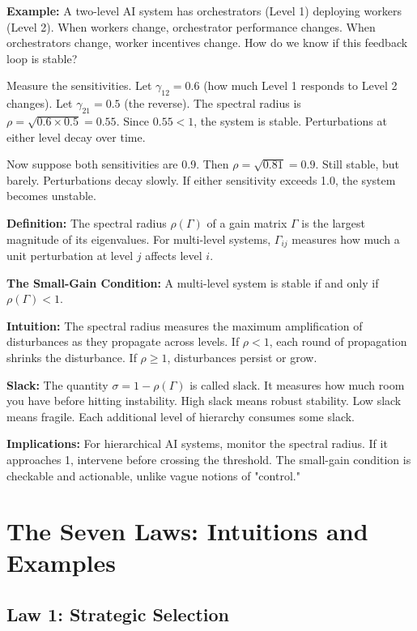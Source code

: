 \documentclass[12pt]{article}
\begin{document}
\textbf{Example:} A two-level AI system has orchestrators (Level 1) deploying workers (Level 2). When workers change, orchestrator performance changes. When orchestrators change, worker incentives change. How do we know if this feedback loop is stable?

Measure the sensitivities. Let $\gamma_{12} = 0.6$ (how much Level 1 responds to Level 2 changes). Let $\gamma_{21} = 0.5$ (the reverse). The spectral radius is $\rho = \sqrt{0.6 \times 0.5} = 0.55$. Since $0.55 < 1$, the system is stable. Perturbations at either level decay over time.

Now suppose both sensitivities are 0.9. Then $\rho = \sqrt{0.81} = 0.9$. Still stable, but barely. Perturbations decay slowly. If either sensitivity exceeds 1.0, the system becomes unstable.

\textbf{Definition:} The spectral radius $\rho(\Gamma)$ of a gain matrix $\Gamma$ is the largest magnitude of its eigenvalues. For multi-level systems, $\Gamma_{ij}$ measures how much a unit perturbation at level $j$ affects level $i$.

\textbf{The Small-Gain Condition:} A multi-level system is stable if and only if $\rho(\Gamma) < 1$.

\textbf{Intuition:} The spectral radius measures the maximum amplification of disturbances as they propagate across levels. If $\rho < 1$, each round of propagation shrinks the disturbance. If $\rho \geq 1$, disturbances persist or grow.

\textbf{Slack:} The quantity $\sigma = 1 - \rho(\Gamma)$ is called slack. It measures how much room you have before hitting instability. High slack means robust stability. Low slack means fragile. Each additional level of hierarchy consumes some slack.

\textbf{Implications:} For hierarchical AI systems, monitor the spectral radius. If it approaches 1, intervene before crossing the threshold. The small-gain condition is checkable and actionable, unlike vague notions of "control."


\section{The Seven Laws: Intuitions and Examples}
\label{app:laws}

\subsection{Law 1: Strategic Selection}
\end{document}
